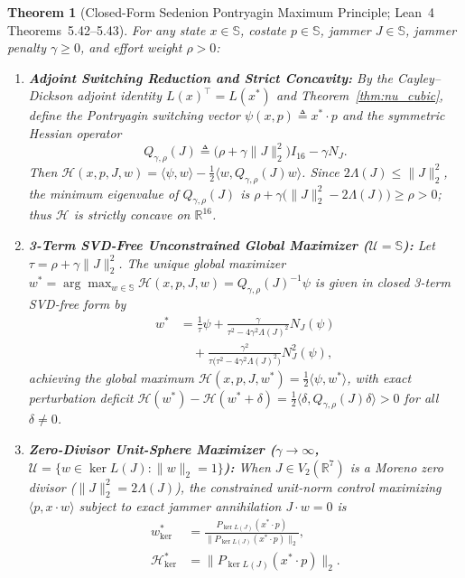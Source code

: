 \documentclass[journal,twoside]{IEEEtran}
\newtheorem{theorem}{Theorem}
\theoremstyle{definition}
\theoremstyle{remark}
\newcommand{\R}{\mathbb{R}}
\newcommand{\Se}{\mathbb{S}}
\begin{document}
\begin{theorem}[Closed-Form Sedenion Pontryagin Maximum Principle; Lean~4 Theorems~5.42--5.43]
\label{thm:pontryagin}
For any state $x \in \Se$, costate $p \in \Se$, jammer $J \in \Se$, jammer penalty $\gamma \ge 0$, and effort weight $\rho > 0$:
\begin{enumerate}
    \item \textbf{Adjoint Switching Reduction and Strict Concavity:} By the Cayley--Dickson adjoint identity $L(x)^\top = L(x^*)$ and Theorem~\ref{thm:nu_cubic}, define the \emph{Pontryagin switching vector} $\psi(x, p) \triangleq x^* \cdot p$ and the symmetric Hessian operator
    \begin{equation}
        Q_{\gamma,\rho}(J) \triangleq \bigl(\rho + \gamma\|J\|_2^2\bigr)I_{16} - \gamma N_J.
        \label{eq:pmp_hessian}
    \end{equation}
    Then $\mathcal{H}(x, p, J, w) = \langle \psi, w\rangle - \frac{1}{2}\langle w, Q_{\gamma,\rho}(J)w\rangle$. Since $2\Lambda(J) \le \|J\|_2^2$, the minimum eigenvalue of $Q_{\gamma,\rho}(J)$ is $\rho + \gamma\bigl(\|J\|_2^2 - 2\Lambda(J)\bigr) \ge \rho > 0$; thus $\mathcal{H}$ is strictly concave on $\R^{16}$.
    \item \textbf{3-Term SVD-Free Unconstrained Global Maximizer ($\mathcal{U} = \Se$):} Let $\tau = \rho + \gamma\|J\|_2^2$. The unique global maximizer $w^* = \arg\max_{w \in \Se}\mathcal{H}(x, p, J, w) = Q_{\gamma,\rho}(J)^{-1}\psi$ is given in closed 3-term SVD-free form by
    \begin{equation}
    \begin{aligned}
        w^* &= \frac{1}{\tau}\psi + \frac{\gamma}{\tau^2 - 4\gamma^2\Lambda(J)^2}N_J(\psi) \\
            &\quad + \frac{\gamma^2}{\tau\bigl(\tau^2 - 4\gamma^2\Lambda(J)^2\bigr)}N_J^2(\psi),
    \end{aligned}
    \label{eq:pmp_wstar}
    \end{equation}
    achieving the global maximum $\mathcal{H}(x, p, J, w^*) = \frac{1}{2}\langle \psi, w^*\rangle$, with exact perturbation deficit $\mathcal{H}(w^*) - \mathcal{H}(w^* + \delta) = \frac{1}{2}\langle \delta, Q_{\gamma,\rho}(J)\delta\rangle > 0$ for all $\delta \neq 0$.
    \item \textbf{Zero-Divisor Unit-Sphere Maximizer ($\gamma \to \infty$, $\mathcal{U} = \{w \in \ker L(J) : \|w\|_2 = 1\}$):} When $J \in V_2(\R^7)$ is a Moreno zero divisor ($\|J\|_2^2 = 2\Lambda(J)$), the constrained unit-norm control maximizing $\langle p, x\cdot w\rangle$ subject to exact jammer annihilation $J \cdot w = 0$ is
    \begin{equation}
    \begin{aligned}
        w^*_{\ker} &= \frac{P_{\ker L(J)}(x^* \cdot p)}{\bigl\|P_{\ker L(J)}(x^* \cdot p)\bigr\|_2}, \\
        \mathcal{H}^*_{\ker} &= \bigl\|P_{\ker L(J)}(x^* \cdot p)\bigr\|_2.
    \end{aligned}
    \label{eq:pmp_zd_sphere}
    \end{equation}
\end{enumerate}
\end{theorem}
\end{document}
